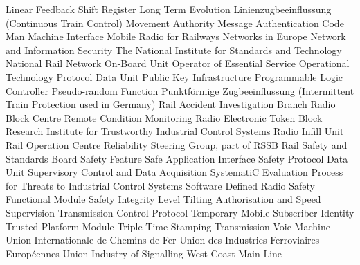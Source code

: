 \begin{acronym}[SCEPTICS]
 {Linear Feedback Shift Register}
 {Long Term Evolution}
 {Linienzugbeeinflussung (Continuous Train Control)}
 {Movement Authority}
 {Message Authentication Code}
 {Man Machine Interface}
 {Mobile Radio for Railways Networks in Europe}
 {Network and Information Security}
 {The National Institute for Standards and Technology}
 {National Rail Network}
 {On-Board Unit}
 {Operator of Essential Service}
 {Operational Technology}
 {Protocol Data Unit}
 {Public Key Infrastructure}
 {Programmable Logic Controller}
 {Pseudo-random Function}
 {Punktf\"ormige Zugbeeinflussung (Intermittent Train Protection used in Germany)}
 {Rail Accident Investigation Branch}
 {Radio Block Centre}
 {Remote Condition Monitoring}
 {Radio Electronic Token Block}
 {Research Institute for Trustworthy Industrial Control Systems}
 {Radio Infill Unit}
 {Rail Operation Centre}
 {Reliability Steering Group, part of RSSB}
 {Rail Safety and Standards Board}
 {Safety Feature}
 {Safe Application Interface}
 {Safety Protocol Data Unit}
 {Supervisory Control and Data Acquisition}
 {SystematiC Evaluation Process for Threats to Industrial Control Systems}
 {Software Defined Radio}
 {Safety Functional Module}
 {Safety Integrity Level}
 {Tilting Authorisation and Speed Supervision}
 {Transmission Control Protocol}
 {Temporary Mobile Subscriber Identity}
 {Trusted Platform Module}
 {Triple Time Stamping}
 {Transmission Voie-Machine}
 {Union Internationale de Chemins de Fer}
 {Union des Industries Ferroviaires Europ\'eennes}
 {Union Industry of Signalling}
 {West Coast Main Line}
\end{acronym}